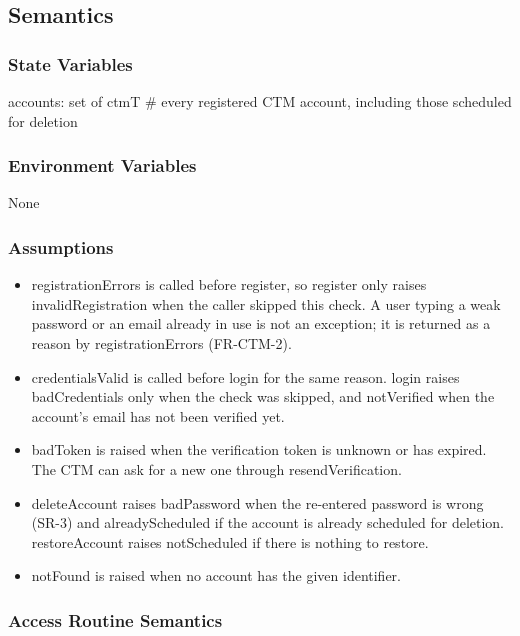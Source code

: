 \documentclass[12pt, titlepage]{article}
\begin{document}
\subsection{Semantics}

\subsubsection{State Variables}

accounts: set of ctmT \# every registered CTM account, including those
scheduled for deletion

\subsubsection{Environment Variables}

None

\subsubsection{Assumptions}

\begin{itemize}
\item registrationErrors is called before register, so register only raises
  invalidRegistration when the caller skipped this check. A user typing a weak
  password or an email already in use is not an exception; it is returned as a
  reason by registrationErrors (FR-CTM-2).
\item credentialsValid is called before login for the same reason. login raises
  badCredentials only when the check was skipped, and notVerified when the
  account's email has not been verified yet.
\item badToken is raised when the verification token is unknown or has expired.
  The CTM can ask for a new one through resendVerification.
\item deleteAccount raises badPassword when the re-entered password is wrong
  (SR-3) and alreadyScheduled if the account is already scheduled for deletion.
  restoreAccount raises notScheduled if there is nothing to restore.
\item notFound is raised when no account has the given identifier.
\end{itemize}

\subsubsection{Access Routine Semantics}
\end{document}
